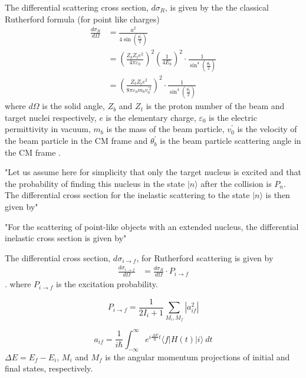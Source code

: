 \documentclass[twoside,english]{uiofysmaster/uiofysmaster}
\begin{document}
The differential scattering cross section, $d\sigma_R$, is given by the the classical Rutherford formula (for point like charges)
\begin{align}
	\frac{d\sigma_R}{d\Omega} 
	&= \frac{a^2}{4 \sin \left( \tfrac{\theta_b^{'}}{2} \right)} \nonumber \\
	&= \left( \frac{Z_b Z_t e^2}{4\pi \varepsilon_0}  \right)^2 \left( \frac{1}{4 E_b}  \right)^2 \cdot \frac{1}{\sin^4 \left( \frac{\theta_b^{'}}{2} \right)} \nonumber \\	
	&= \left( \frac{Z_b Z_t e^2}{8 \pi \varepsilon_0 m_b v_0^{' 2}} \right)^2 \cdot \frac{1}{\sin^4 \left( \frac{\theta_b^{'}}{2} \right)} 
\end{align}
where $d\Omega$ is the solid angle, $Z_b$ and $Z_t$ is the proton number of the beam and target nuclei respectively, $e$ is the elementary charge, $\varepsilon_0$ is the electric permittivity in vacuum, $m_b$ is the mass of the beam particle, $v_0^{'}$ is the velocity of the beam particle in the CM frame and $\theta_b^{'}$ is the beam particle scattering angle in the CM frame \cite{Klintefjord, Krane, EE-Coulex}.


"Let us assume here for simplicity that only the target nucleus is excited and that the probability of finding this nucleus in the state $|n\rangle$ after the collision is $P_n$. The differential cross section for the inelastic scattering to the state $|n\rangle$ is then given by" \cite{EE-Coulex}

"For the scattering of point-like objects with an extended nucleus, the differential inelastic cross section is given by"

The differential cross section, $d\sigma_{i \rightarrow f}$, for Rutherford scattering is given by 
\begin{align}
	\frac{d\sigma_{i \rightarrow f}}{d\Omega} 
	&= \frac{d\sigma_R}{d\Omega} \cdot P_{i \rightarrow f} 
\end{align}
 \cite{EE-Coulex}.
where $P_{i \rightarrow f}$ is the excitation probability.


\bigskip


\begin{equation}
	P_{i \rightarrow f} = \frac{1}{2I_i + 1} \sum_{M_i, M_f} | a_{if}^2 |
\end{equation}

\begin{equation}
	a_{if} = \frac{1}{i\hbar} \int_{-\infty}^{\infty} e^{i \frac{\Delta E}{\hbar} t} \langle f | H(t) | i \rangle ~dt
\end{equation}
$\Delta E = E_f - E_i$, $M_i$ and $M_f$ is the angular momentum projections of initial and final states, respectively. 
\cite{Klintefjord}
\end{document}
